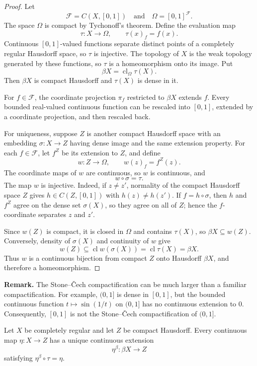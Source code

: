 \begin{proof}
Let
\[
\mathcal{F}=C(X,[0,1])
\quad\text{and}\quad
\Omega=[0,1]^{\mathcal{F}}.
\]
The space $\Omega$ is compact by Tychonoff's theorem. Define the evaluation
map
\[
\tau:X\longrightarrow\Omega,
\qquad
\tau(x)_f=f(x).
\]
Continuous $[0,1]$-valued functions separate distinct points of a completely
regular Hausdorff space, so $\tau$ is injective. The topology of $X$ is the
weak topology generated by these functions, so $\tau$ is a homeomorphism onto
its image. Put
\[
\beta X=\operatorname{cl}_{\Omega}\tau(X).
\]
Then $\beta X$ is compact Hausdorff and $\tau(X)$ is dense in it.

For $f\in\mathcal{F}$, the coordinate projection $\pi_f$ restricted to
$\beta X$ extends $f$. Every bounded real-valued continuous function can be
rescaled into $[0,1]$, extended by a coordinate projection, and then rescaled
back.

For uniqueness, suppose $Z$ is another compact Hausdorff space with an
embedding $\sigma:X\to Z$ having dense image and the same extension property.
For each $f\in\mathcal{F}$, let $f^Z$ be its extension to $Z$, and define
\[
w:Z\longrightarrow\Omega,
\qquad
w(z)_f=f^Z(z).
\]
The coordinate maps of $w$ are continuous, so $w$ is continuous, and
\[
w\circ\sigma=\tau.
\]
The map $w$ is injective. Indeed, if $z\neq z'$, normality of the compact
Hausdorff space $Z$ gives $h\in C(Z,[0,1])$ with $h(z)\neq h(z')$. If
$f=h\circ\sigma$, then $h$ and $f^Z$ agree on the dense set $\sigma(X)$, so
they agree on all of $Z$; hence the $f$-coordinate separates $z$ and $z'$.

Since $w(Z)$ is compact, it is closed in $\Omega$ and contains $\tau(X)$, so
$\beta X\subseteq w(Z)$. Conversely, density of $\sigma(X)$ and continuity of
$w$ give
\[
w(Z)\subseteq\operatorname{cl}w(\sigma(X))
=\operatorname{cl}\tau(X)=\beta X.
\]
Thus $w$ is a continuous bijection from compact $Z$ onto Hausdorff $\beta X$,
and therefore a homeomorphism.
\end{proof}

\medskip
\noindent\textbf{Remark.}
The Stone--\v{C}ech compactification can be much larger than a familiar
compactification. For example, $(0,1]$ is dense in $[0,1]$, but the bounded
continuous function $t\mapsto\sin(1/t)$ on $(0,1]$ has no continuous
extension to $0$. Consequently, $[0,1]$ is not the Stone--\v{C}ech
compactification of $(0,1]$.
\medskip

\begin{thm}
Let $X$ be completely regular and let $Z$ be compact Hausdorff. Every
continuous map $\eta:X\to Z$ has a unique continuous extension
\[
\eta^\beta:\beta X\to Z
\]
satisfying $\eta^\beta\circ\tau=\eta$.
\end{thm}

